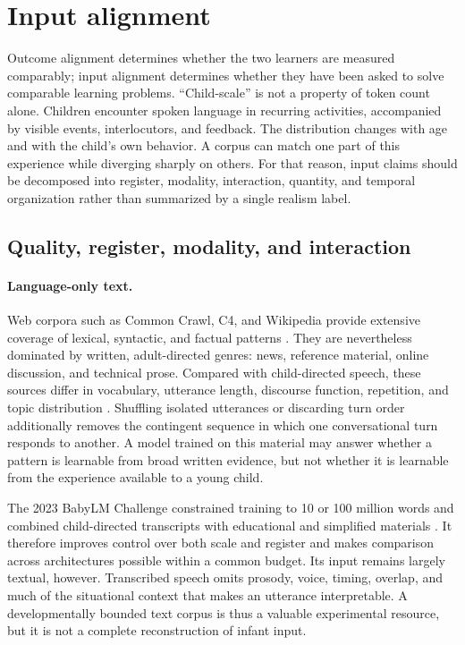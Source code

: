 \section{Input alignment}
\label{sec:litreview:input}

Outcome alignment determines whether the two learners are measured comparably; input alignment determines whether they have been asked to solve comparable learning problems. ``Child-scale'' is not a property of token count alone. Children encounter spoken language in recurring activities, accompanied by visible events, interlocutors, and feedback. The distribution changes with age and with the child's own behavior. A corpus can match one part of this experience while diverging sharply on others. For that reason, input claims should be decomposed into register, modality, interaction, quantity, and temporal organization rather than summarized by a single realism label.

\subsection{Quality, register, modality, and interaction}
\label{sec:litreview:input-quality}

\paragraph{Language-only text.}
Web corpora such as Common Crawl, C4, and Wikipedia provide extensive coverage of lexical, syntactic, and factual patterns \citep{buck2014n,raffel2020exploring,Kaplan2020}. They are nevertheless dominated by written, adult-directed genres: news, reference material, online discussion, and technical prose. Compared with child-directed speech, these sources differ in vocabulary, utterance length, discourse function, repetition, and topic distribution \citep{huebner2021babyberta}. Shuffling isolated utterances or discarding turn order additionally removes the contingent sequence in which one conversational turn responds to another. A model trained on this material may answer whether a pattern is learnable from broad written evidence, but not whether it is learnable from the experience available to a young child.

The 2023 BabyLM Challenge constrained training to 10 or 100 million words and combined child-directed transcripts with educational and simplified materials \citep{warstadt2023findings}. It therefore improves control over both scale and register and makes comparison across architectures possible within a common budget. Its input remains largely textual, however. Transcribed speech omits prosody, voice, timing, overlap, and much of the situational context that makes an utterance interpretable. A developmentally bounded text corpus is thus a valuable experimental resource, but it is not a complete reconstruction of infant input.

